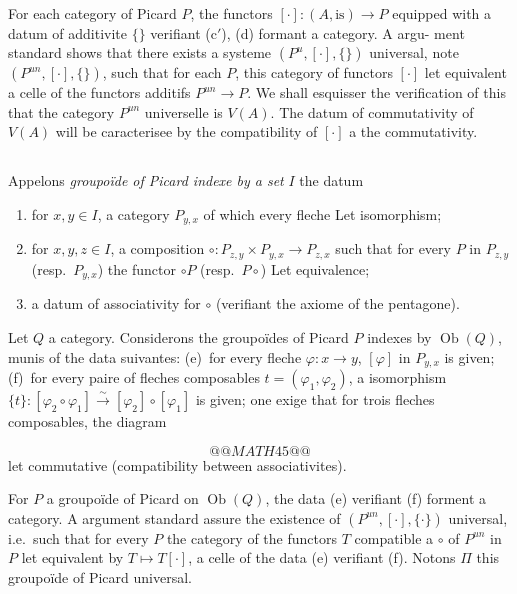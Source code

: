 \documentclass[12pt,a4paper]{article}
\theoremstyle{plain}
\theoremstyle{definition}
\DeclareMathOperator{\Ob}{Ob}
\begin{document}
For each category of Picard $P$, the functors $[\cdot]: (A, \text{is}) \to P$ equipped with a datum of additivite $\{\}$ verifiant (c$'$), (d) formant a category. A argu-
ment standard shows that there exists a systeme $(P^u, [\cdot], \{\})$ universal, note
$(P^{un}, [\cdot], \{\})$, such that for each $P$, this category of functors $[\cdot]$
let equivalent a celle of the functors additifs $P^{un} \to P$. We shall esquisser
the verification of this that the category $P^{un}$ universelle is $V(A)$. The datum
of commutativity of $V(A)$ will be caracterisee by the compatibility of $[\cdot]$ a the
commutativity.

\subsection{}

Appelons \emph{groupo\"ide of Picard indexe by a set} $I$ the datum

\begin{enumerate}[label=(\alph*)]
\item for $x, y \in I$, a category $P_{y,x}$ of which every fleche Let isomorphism;
\item for $x, y, z \in I$, a composition $\circ: P_{z,y} \times P_{y,x} \to P_{z,x}$ such that for every $P$
in $P_{z,y}$ (resp.\ $P_{y,x}$) the functor $\circ P$ (resp.\ $P \circ$) Let equivalence;
\item a datum of associativity for $\circ$ (verifiant the axiome of the pentagone).
\end{enumerate}

Let $Q$ a category. Considerons the groupo\"ides of Picard $P$ indexes
by $\Ob(Q)$, munis of the data suivantes: (e)~for every fleche $\varphi: x \to y$,
$[\varphi]$ in $P_{y,x}$ is given; (f)~for every paire of fleches composables $t =
(\varphi_1, \varphi_2)$, a isomorphism $\{t\}: [\varphi_2 \circ \varphi_1] \xrightarrow{\sim} [\varphi_2] \circ [\varphi_1]$ is given; one exige
that for trois fleches composables, the diagram

\[
@@MATH45@@
\]
let commutative (compatibility between associativites).

For $P$ a groupo\"ide of Picard on $\Ob(Q)$, the data (e) verifiant (f)
forment a category. A argument standard assure the existence of $(P^{un}, [\cdot], \{\cdot\})$
universal, i.e.\ such that for every $P$ the category of the functors $T$ compatible
a $\circ$ of $P^{un}$ in $P$ let equivalent by $T \mapsto T[\cdot]$, a celle of the data
(e) verifiant (f). Notons $\Pi$ this groupo\"ide of Picard universal.
\end{document}
